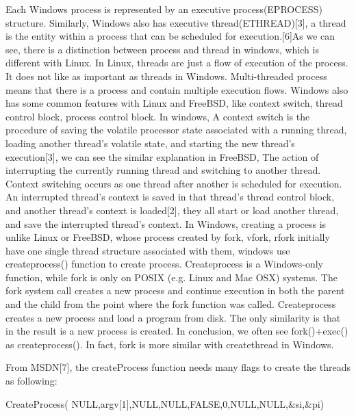 \documentclass[10pt,draftclsnofoot,peerreview,letterpaper,onecolumn,]{IEEEtran}
\begin{document}
Each Windows process is represented by an executive process(EPROCESS) structure. Similarly, Windows also has executive thread(ETHREAD)[3], a thread is the entity within a process that can be scheduled for execution.[6]As we can see, there is a distinction between process and thread in windows, which is different with Linux. In Linux, threads are just a flow of execution of the process. It does not like as important as threads in Windows. Multi-threaded process means that there is a process and contain multiple execution flows. Windows also has some common features with Linux and FreeBSD, like context switch, thread control block, process control block. In windows, A context switch is the procedure of saving the volatile processor state associated with a running thread, loading another thread's volatile state, and starting the new thread's execution[3], we can see the similar explanation in FreeBSD, The action of interrupting the currently running thread and switching to another thread. Context switching occurs as one thread after another is scheduled for execution. An interrupted thread’s context is saved in that thread’s thread control block, and another thread's context is loaded[2], they all start or load another thread, and save the interrupted thread's context. In Windows, creating a process is unlike Linux or FreeBSD, whose process created by fork, vfork, rfork initially have one single thread structure associated with them, windows use createprocess() function to create process. Createprocess is a Windows-only function, while fork is only on POSIX (e.g. Linux and Mac OSX) systems. The fork system call creates a new process and continue execution in both the parent and the child from the point where the fork function was called. Createprocess creates a new process and load a program from disk. The only similarity is that in the result is a new process is created. In conclusion, we often see fork()+exec() as createprocess(). In fact, fork is more similar with createthread in Windows.

From MSDN[7], the createProcess function needs many flags to create the threads as following:

CreateProcess( NULL,argv[1],NULL,NULL,FALSE,0,NULL,NULL,\&si,\&pi)
\end{document}
